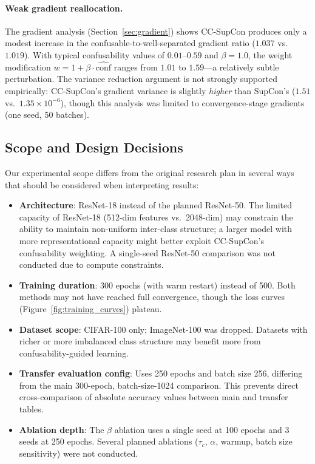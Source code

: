 \documentclass{article}
\newcommand{\conf}{\widehat{\mathrm{conf}}}
\begin{document}
\paragraph{Weak gradient reallocation.} The gradient analysis (Section~\ref{sec:gradient}) shows CC-SupCon produces only a modest increase in the confusable-to-well-separated gradient ratio ($1.037$ vs.\ $1.019$). With typical confusability values of $0.01$--$0.59$ and $\beta = 1.0$, the weight modification $w = 1 + \beta \cdot \conf$ ranges from $1.01$ to $1.59$---a relatively subtle perturbation. The variance reduction argument is not strongly supported empirically: CC-SupCon's gradient variance is slightly \emph{higher} than SupCon's ($1.51$ vs.\ $1.35 \times 10^{-6}$), though this analysis was limited to convergence-stage gradients (one seed, 50 batches).

\subsection{Scope and Design Decisions}

Our experimental scope differs from the original research plan in several ways that should be considered when interpreting results:

\begin{itemize}
    \item \textbf{Architecture}: ResNet-18 instead of the planned ResNet-50. The limited capacity of ResNet-18 (512-dim features vs.\ 2048-dim) may constrain the ability to maintain non-uniform inter-class structure; a larger model with more representational capacity might better exploit CC-SupCon's confusability weighting. A single-seed ResNet-50 comparison was not conducted due to compute constraints.
    \item \textbf{Training duration}: 300 epochs (with warm restart) instead of 500. Both methods may not have reached full convergence, though the loss curves (Figure~\ref{fig:training_curves}) plateau.
    \item \textbf{Dataset scope}: CIFAR-100 only; ImageNet-100 was dropped. Datasets with richer or more imbalanced class structure may benefit more from confusability-guided learning.
    \item \textbf{Transfer evaluation config}: Uses 250 epochs and batch size 256, differing from the main 300-epoch, batch-size-1024 comparison. This prevents direct cross-comparison of absolute accuracy values between main and transfer tables.
    \item \textbf{Ablation depth}: The $\beta$ ablation uses a single seed at 100 epochs and 3 seeds at 250 epochs. Several planned ablations ($\tau_c$, $\alpha$, warmup, batch size sensitivity) were not conducted.
\end{itemize}
\end{document}
